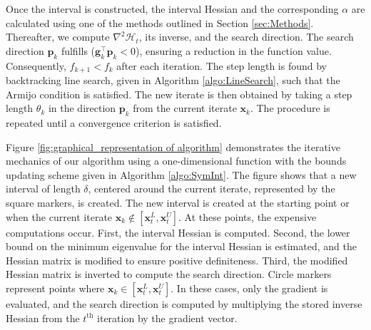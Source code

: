 \documentclass{elsarticle}
\numberwithin{equation}{section}
\begin{document}
Once the interval is constructed, the interval Hessian and the corresponding $\alpha$ are calculated using one of the methods outlined in Section \ref{sec:Methods}. Thereafter, we compute $\nabla^2\mathcal{H}_t$, its inverse, and the search direction. The search direction $\mathbf{p}_k$ fulfills ($\mathbf{g}_k^{\top}\mathbf{p}_{k}<0$), ensuring a reduction in the function value. Consequently, $f_{k+1} < f_k$ after each iteration. The step length is found by backtracking line search, given in Algorithm \ref{algo:LineSearch}, such that the Armijo condition is satisfied. The new iterate is then obtained by taking a step length $\theta_k$ in the direction $\mathbf{p}_k$ from the current iterate $\mathbf{x}_k$. The procedure is repeated until a convergence criterion is satisfied.  

Figure \ref{fig:graphical_representation of algorithm} demonstrates the iterative mechanics of our algorithm using a one-dimensional function with the bounds updating scheme given in Algorithm \ref{algo:SymInt}. The figure shows that a new interval of length $\delta$, centered around the current iterate, represented by the square markers, is created. The new interval is created at the starting point or when the current iterate $\mathbf{x}_k \notin [\mathbf{x}_t^L, \mathbf{x}_t^U]$. At these points, the expensive computations occur. First, the interval Hessian is computed. Second, the lower bound on the minimum eigenvalue for the interval Hessian is estimated, and the Hessian matrix is modified to ensure positive definiteness. Third, the modified Hessian matrix is inverted to compute the search direction. Circle markers represent points where $\mathbf{x}_k \in [\mathbf{x}_t^L, \mathbf{x}_t^U]$. In these cases, only the gradient is evaluated, and the search direction is computed by multiplying the stored inverse Hessian from the $t^{\text{th}}$ iteration by the gradient vector.
\end{document}
